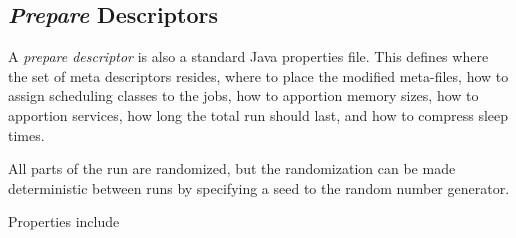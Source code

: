      \subsection{{\em Prepare} Descriptors}
     \label{subsec:simulation.run-description}
     A  {\em prepare descriptor} is also a
     standard Java properties file.  This defines where the set of meta descriptors resides,
     where to place the modified meta-files, how to assign scheduling classes to the
     jobs, how to apportion memory sizes, how to apportion services, how long the total
     run should last, and how to compress sleep times.  

     All parts of the run are randomized, but the randomization can be made deterministic
     between runs by specifying a seed to the random number generator.

     Properties include
